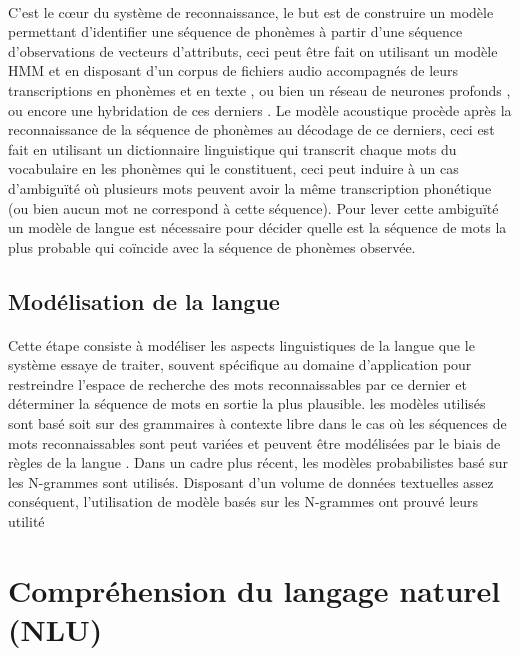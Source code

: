 		\paragraph{}
		C'est le cœur du système de reconnaissance, le but est de construire un modèle permettant d'identifier une séquence de phonèmes à partir d'une séquence d'observations de vecteurs d'attributs, ceci peut être fait on utilisant un modèle HMM et en disposant d'un corpus de fichiers audio accompagnés de leurs transcriptions en phonèmes et en texte \cite{hmm_acoustic_model} \cite{hmm_formal}, ou bien un réseau de neurones profonds \cite{speech_reco_Yu2015}, ou encore une hybridation de ces derniers \cite{dnn-hmm_acoustic_model}. Le modèle acoustique procède après la reconnaissance de la séquence de phonèmes au décodage de ce derniers, ceci est fait en utilisant un dictionnaire linguistique qui transcrit chaque mots du vocabulaire en les phonèmes qui le constituent, ceci peut induire à un cas d'ambiguïté où plusieurs mots peuvent avoir la même transcription phonétique (ou bien aucun mot ne correspond à cette séquence). Pour lever cette ambiguïté un modèle de langue est nécessaire pour décider quelle est la séquence de mots la plus probable qui coïncide avec la séquence de phonèmes observée.  
	\subsection{Modélisation de la langue}
		\paragraph{}
		Cette étape consiste à modéliser les aspects linguistiques de la langue que le système essaye de traiter, souvent spécifique au domaine d'application pour restreindre l'espace de recherche des mots reconnaissables par ce dernier et déterminer la séquence de mots en sortie la plus plausible. les modèles utilisés sont basé soit sur des grammaires à contexte libre dans le cas où les séquences de mots reconnaissables sont peut variées et peuvent être modélisées par le biais de règles de la langue \cite{LM_grammar}. Dans un cadre plus récent, les modèles probabilistes basé sur les N-grammes sont utilisés. Disposant d'un volume de données textuelles assez conséquent, l'utilisation de modèle basés sur les N-grammes ont prouvé leurs utilité \cite{nlp_ngrams}\cite{speech_reco_Yu2015}\cite{LM_n-grams}
		
		
\section{Compréhension du langage naturel (NLU)}
